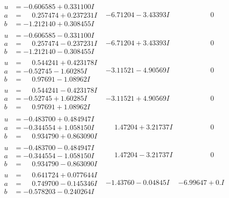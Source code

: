 \documentclass[1p]{elsarticle_modified}
\theoremstyle{definition}
\begin{document}
$$\begin{array}{c|c|c}
\begin{aligned}
u &= -0.606585 + 0.331100 I \\
a &= \phantom{-}0.257474 + 0.237231 I \\
b &= -1.212140 + 0.308455 I\end{aligned}
 & -6.71204 - 3.43393 I & \phantom{-0.000000 } 0 \\ \hline\begin{aligned}
u &= -0.606585 - 0.331100 I \\
a &= \phantom{-}0.257474 - 0.237231 I \\
b &= -1.212140 - 0.308455 I\end{aligned}
 & -6.71204 + 3.43393 I & \phantom{-0.000000 } 0 \\ \hline\begin{aligned}
u &= \phantom{-}0.544241 + 0.423178 I \\
a &= -0.52745 - 1.60285 I \\
b &= \phantom{-}0.97691 - 1.08962 I\end{aligned}
 & -3.11521 - 4.90569 I & \phantom{-0.000000 } 0 \\ \hline\begin{aligned}
u &= \phantom{-}0.544241 - 0.423178 I \\
a &= -0.52745 + 1.60285 I \\
b &= \phantom{-}0.97691 + 1.08962 I\end{aligned}
 & -3.11521 + 4.90569 I & \phantom{-0.000000 } 0 \\ \hline\begin{aligned}
u &= -0.483700 + 0.484947 I \\
a &= -0.344554 + 1.058150 I \\
b &= \phantom{-}0.934790 + 0.863090 I\end{aligned}
 & \phantom{-}1.47204 + 3.21737 I & \phantom{-0.000000 } 0 \\ \hline\begin{aligned}
u &= -0.483700 - 0.484947 I \\
a &= -0.344554 - 1.058150 I \\
b &= \phantom{-}0.934790 - 0.863090 I\end{aligned}
 & \phantom{-}1.47204 - 3.21737 I & \phantom{-0.000000 } 0 \\ \hline\begin{aligned}
u &= \phantom{-}0.641724 + 0.077644 I \\
a &= \phantom{-}0.749700 - 0.145346 I \\
b &= -0.578203 - 0.240264 I\end{aligned}
 & -1.43760 - 0.04845 I & -6.99647 + 0. I\phantom{ +0.000000I} \\ \hline\begin{aligned}

\end{aligned}
\end{array}$$
\end{document}
